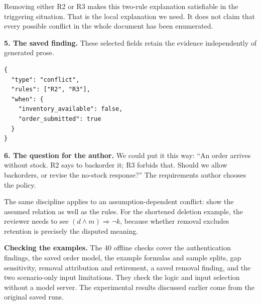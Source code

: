 Removing either R2 or R3 makes this two-rule explanation satisfiable in the triggering situation. That is the local explanation we need. It does not claim that every possible conflict in the whole document has been enumerated.

\textbf{5. The saved finding.} These selected fields retain the evidence independently of generated prose.
\begin{lstlisting}
{
  "type": "conflict",
  "rules": ["R2", "R3"],
  "when": {
    "inventory_available": false,
    "order_submitted": true
  }
}
\end{lstlisting}

\textbf{6. The question for the author.} We could put it this way: ``An order arrives without stock. R2 says to backorder it; R3 forbids that. Should we allow backorders, or revise the no-stock response?'' The requirements author chooses the policy.

The same discipline applies to an assumption-dependent conflict: show the assumed relation as well as the rules. For the shortened deletion example, the reviewer needs to see $(d\land m)\Rightarrow\neg k$, because whether removal excludes retention is precisely the disputed meaning.

\textbf{Checking the examples.} The 40 offline checks cover the authentication findings, the saved order model, the example formulas and sample splits, gap sensitivity, removal attribution and retirement, a saved removal finding, and the two scenario-only input limitations. They check the logic and input selection without a model server. The experimental results discussed earlier come from the original saved runs.
